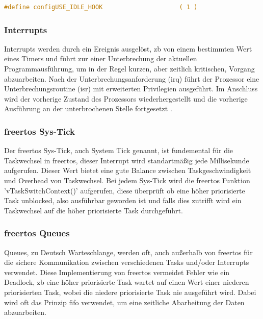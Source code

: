 \documentclass[../EDF Master Thesis.tex]{subfiles}
\begin{document}
\begin{lstlisting}[language=C, caption=FreeRTOS Idle Task Hook, label=code:freertos_idle_task_hook]
    #define configUSE_IDLE_HOOK                     ( 1 )
\end{lstlisting}


\subsubsection{Interrupts} \label{section:interrupts}
Interrupts werden durch ein Ereignis ausgelöst, \ac{zb} von einem bestimmten Wert eines Timers und führt zur einer Unterbrechung der aktuellen Programmausführung, um in der Regel kurzen, aber zeitlich kritischen, Vorgang abzuarbeiten.
Nach der Unterbrechungsanforderung (\ac{irq}) führt der Prozessor eine Unterbrechungsroutine (\ac{isr}) mit erweiterten Privilegien ausgeführt.
Im Anschluss wird der vorherige Zustand des Prozessors wiederhergestellt und die vorherige Ausführung an der unterbrochenen Stelle fortgesetzt \parencite{wiki:008}.


\subsubsection{\ac{freertos} Sys-Tick} \label{section:freertos_sys-tick}
Der \ac{freertos} Sys-Tick, auch System Tick genannt, ist fundemental für die Taskwechsel in \ac{freertos}, dieser Interrupt wird standartmäßig jede Millisekunde aufgerufen.
Dieser Wert bietet eine gute Balance zwischen Taskgeschwindigkeit und Overhead von Taskwechsel.
Bei jedem Sys-Tick wird die \ac{freertos} Funktion 'vTaskSwitchContext()' aufgerufen, diese überprüft ob eine höher priorisierte Task unblocked, also ausführbar geworden ist und falls dies zutrifft wird ein Taskwechsel auf die höher priorisierte Task durchgeführt.

\subsubsection{\ac{freertos} Queues} \label{section:queues}
Queues, zu Deutsch Warteschlange, werden oft, auch außerhalb von \ac{freertos} für die sichere Kommunikation zwischen verschiedenen Tasks und/oder Interrupts verwendet.
Diese Implementierung von \ac{freertos} vermeidet Fehler wie ein Deadlock, \ac{zb} eine höher priorisierte Task wartet auf einen Wert einer niederen priorisierten Task, wobei die niedere priorisierte Task nie ausgeführt wird.
Dabei wird oft das Prinzip \ac{fifo} verwendet, um eine zeitliche Abarbeitung der Daten abzuarbeiten.
\end{document}
